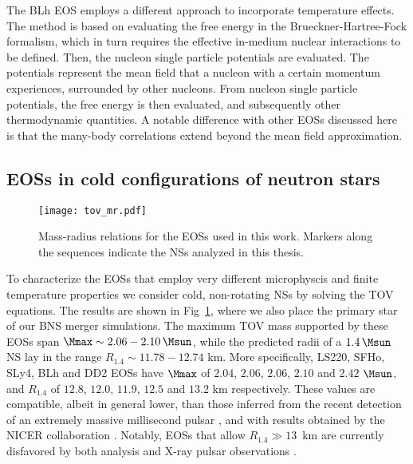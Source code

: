 The BLh \ac{EOS} employs a different approach to incorporate temperature effects.
The method is based on evaluating the free energy in the Brueckner-Hartree-Fock formalism, 
which in turn requires the effective in-medium nuclear interactions to be defined.
%
Then, the nucleon single particle potentials 
are evaluated. The potentials represent the mean field that a nucleon with a certain momentum experiences, 
surrounded by other nucleons. 
From nucleon single particle potentials, the free energy 
is then evaluated, and subsequently other thermodynamic quantities. 
A notable difference 
with other \acp{EOS} discussed here is that the many-body correlations extend beyond the 
mean field approximation. %
%



\subsection{EOSs in cold configurations of neutron stars}


\begin{figure}[t]
    \centering 
    \texttt{[image: tov\_mr.pdf]}
    \caption{
        Mass-radius relations for the \acp{EOS} used in this work. 
        Markers along the sequences indicate the \acp{NS} analyzed in this thesis.
    }
    \label{fig:method:tov_mr}
\end{figure}
To characterize the \acp{EOS} that employ very different microphyscis and finite 
temperature properties
we consider 
cold, non-rotating \acp{NS} by solving the \ac{TOV} equations.
The results are shown in Fig~\ref{fig:method:tov_mr}, where we also place 
the primary star of our \ac{BNS} merger simulations. 
%
The maximum \ac{TOV} mass supported by these \acp{EOS} span  
$\Mmax \sim 2.06-2.10\,\Msun$, while the predicted radii of a $1.4\,\Msun$ 
\ac{NS} lay in the range $R_{1.4}\sim 11.78-12.74$ km. 
More specifically, LS220, SFHo, SLy4, BLh and DD2 \acp{EOS} have 
$\Mmax$ of $2.04$, $2.06$, $2.06$, $2.10$ and $2.42$ $\Msun$, and 
$R_{1.4}$ of $12.8$, $12.0$, $11.9$, $12.5$ and $13.2$ km respectively. 
%
These values are compatible, albeit in general lower, than those inferred from the 
recent detection of an extremely massive millisecond pulsar \citep{Cromartie:2019kug},  
and with results obtained by the NICER collaboration \citep{Miller:2019cac,Riley:2019yda}.
Notably, \acp{EOS} that allow $R_{1.4}\gg 13$~km are currently disfavored by both 
\GW{} analysis and X-ray pulsar observations \citep{Abbott:2018wiz,Miller:2019cac,Riley:2019yda}.

